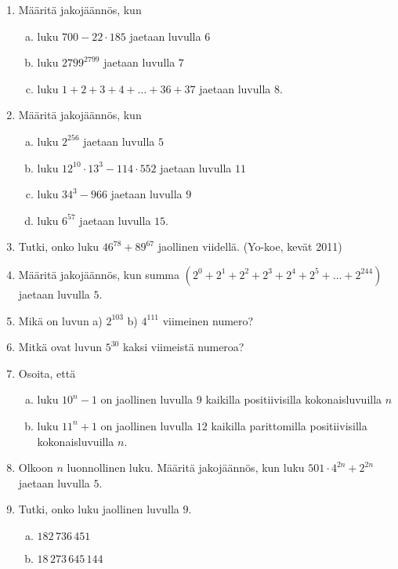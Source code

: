 \begin{tehtavasivu}
\begin{enumerate}

\item Määritä jakojäännös, kun
\begin{enumerate}[a)]
\item luku $700 - 22 \cdot 185$ jaetaan luvulla $6$
\item luku $2799^{2799}$ jaetaan luvulla $7$
\item luku $1+2+3+4+ \ldots + 36 + 37$ jaetaan luvulla $8$.
\end{enumerate}

\item Määritä jakojäännös, kun
\begin{enumerate}[a)]
\item luku $2^{256}$ jaetaan luvulla $5$
\item luku $12^{10} \cdot 13^{3} - 114 \cdot 552$ jaetaan luvulla $11$
\item luku $34^{3} - 966$ jaetaan luvulla $9$
\item luku $6^{57}$ jaetaan luvulla $15$.
\end{enumerate}


\item
Tutki, onko luku $46^{78} + 89^{67}$ jaollinen viidellä. (Yo-koe, kevät 2011)

\item Määritä jakojäännös, kun summa $(2^0 + 2^1 + 2^2 + 2^3 + 2^4 + 2^5 + \ldots + 2^{244})$ jaetaan luvulla $5$.

\item Mikä on luvun a) $2^{103}$  b) $4^{111}$ viimeinen numero?

\item Mitkä ovat luvun $5^{30}$ kaksi viimeistä numeroa?

\item Osoita, että
\begin{enumerate}[a)]
\item luku $10^n - 1$ on jaollinen luvulla $9$ kaikilla positiivisilla kokonaisluvuilla $n$
\item luku $11^n + 1$ on jaollinen luvulla $12$ kaikilla parittomilla positiivisilla kokonaisluvuilla $n$.
\end{enumerate}

\item Olkoon $n$ luonnollinen luku. Määritä jakojäännös, kun luku $501 \cdot 4^{2n} + 2^{2n}$ jaetaan luvulla $5$.

\item
Tutki, onko luku jaollinen luvulla $9$.
\begin{enumerate}[a)]
\item $182\, 736\, 451$
\item $18\, 273\, 645\, 144$
\end{enumerate}


\end{enumerate}
\end{tehtavasivu}
